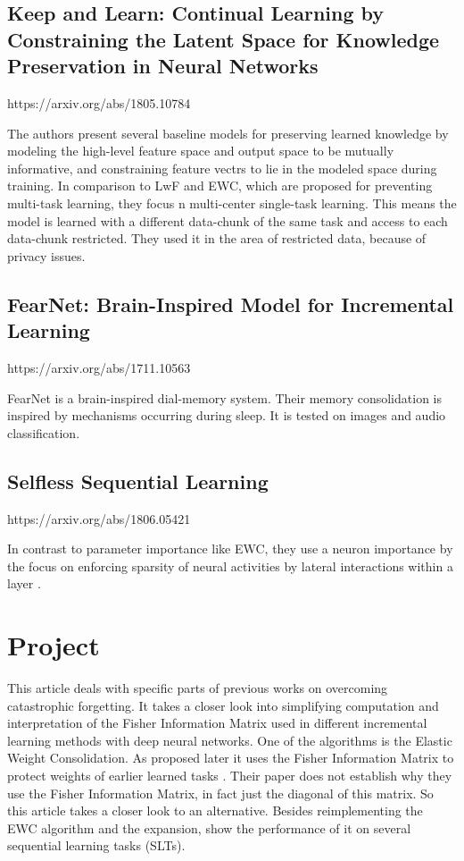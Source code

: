 \subsection*{Keep and Learn: Continual Learning by Constraining the Latent Space for Knowledge Preservation in Neural Networks}
https://arxiv.org/abs/1805.10784

The authors present several baseline models for preserving learned knowledge by modeling the high-level feature space and output space to be mutually informative, and constraining feature vectrs to lie in the modeled space during training.
In comparison to LwF and EWC, which are proposed for preventing multi-task learning, they focus n multi-center single-task learning.
This means the model is learned with a different data-chunk of the same task and access to each data-chunk restricted.
They used it in the area of restricted data, because of privacy issues.

\subsection*{FearNet: Brain-Inspired Model for Incremental Learning}
https://arxiv.org/abs/1711.10563

FearNet is a brain-inspired dial-memory system.
Their memory consolidation is inspired by mechanisms occurring during sleep.
It is tested on images and audio classification.

\subsection*{Selfless Sequential Learning}
https://arxiv.org/abs/1806.05421

In contrast to parameter importance like EWC, they use a neuron importance by the focus on enforcing sparsity of neural activities by lateral interactions within a layer \cite{cf_application_oriented_study}.


\section{Project}

This article deals with specific parts of previous works on overcoming catastrophic forgetting.
It takes a closer look into simplifying computation and interpretation of the Fisher Information Matrix used in different incremental learning methods with deep neural networks.
One of the algorithms is the Elastic Weight Consolidation.
As proposed later it uses the Fisher Information Matrix to protect weights of earlier learned tasks \cite{elastic-weight-consolidation}.
Their paper does not establish why they use the Fisher Information Matrix, in fact just the diagonal of this matrix.
So this article takes a closer look to an alternative.
Besides reimplementing the EWC algorithm and the expansion, show the performance of it on several sequential learning tasks (SLTs).

